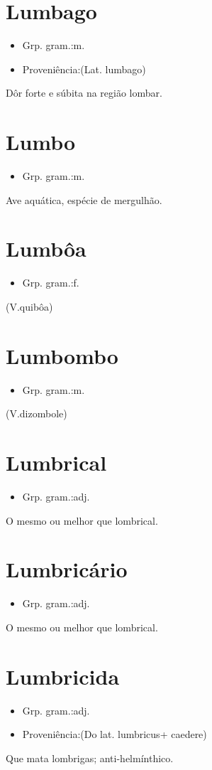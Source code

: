 \section{Lumbago}
\begin{itemize}
\item {Grp. gram.:m.}
\end{itemize}
\begin{itemize}
\item {Proveniência:(Lat. \textunderscore lumbago\textunderscore )}
\end{itemize}
Dôr forte e súbita na região lombar.
\section{Lumbo}
\begin{itemize}
\item {Grp. gram.:m.}
\end{itemize}
Ave aquática, espécie de mergulhão.
\section{Lumbôa}
\begin{itemize}
\item {Grp. gram.:f.}
\end{itemize}
(V.quibôa)
\section{Lumbombo}
\begin{itemize}
\item {Grp. gram.:m.}
\end{itemize}
(V.dizombole)
\section{Lumbrical}
\begin{itemize}
\item {Grp. gram.:adj.}
\end{itemize}
O mesmo ou melhor que \textunderscore lombrical\textunderscore .
\section{Lumbricário}
\begin{itemize}
\item {Grp. gram.:adj.}
\end{itemize}
O mesmo ou melhor que \textunderscore lombrical\textunderscore .
\section{Lumbricida}
\begin{itemize}
\item {Grp. gram.:adj.}
\end{itemize}
\begin{itemize}
\item {Proveniência:(Do lat. \textunderscore lumbricus\textunderscore  + \textunderscore caedere\textunderscore )}
\end{itemize}
Que mata lombrigas; anti-helmínthico.
